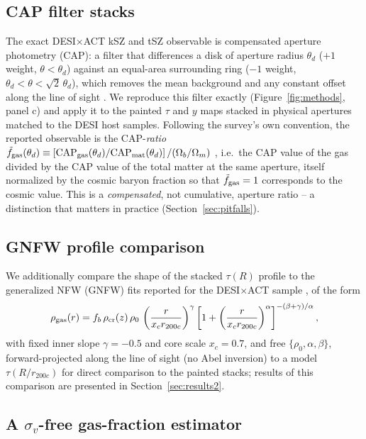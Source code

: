 \documentclass[11pt]{article}
\newcommand{\fgt}{\tilde{f}_{\rm gas}}          %
\begin{document}
\subsection{CAP filter stacks}\label{sec:cap}

The exact DESI$\times$ACT kSZ and tSZ observable is compensated aperture
photometry (CAP): a filter that differences a disk of aperture radius
$\theta_d$ ($+1$ weight, $\theta<\theta_d$) against an equal-area surrounding
ring ($-1$ weight, $\theta_d<\theta<\sqrt{2}\,\theta_d$), which removes the
mean background and any constant offset along the line of sight
\citep{kszpartII}. We reproduce this filter exactly (Figure~\ref{fig:methods},
panel c) and apply it to the painted $\tau$ and $y$ maps stacked in physical
apertures matched to the DESI host samples. Following the survey's own
convention, the reported observable is the CAP-\emph{ratio}
$\fgt(\theta_d) \equiv \left[\mathrm{CAP}_{\rm gas}(\theta_d)/\mathrm{CAP}_{\rm mat}(\theta_d)\right]/(\Omega_b/\Omega_m)$
\citep{kszpartII}, i.e.\ the CAP value of the gas divided by the CAP value of
the total matter at the same aperture, itself normalized by the cosmic baryon
fraction so that $\fgt=1$ corresponds to the cosmic value. This is a
\emph{compensated}, not cumulative, aperture ratio -- a distinction that matters
in practice (Section~\ref{sec:pitfalls}).

\subsection{GNFW profile comparison}\label{sec:gnfw}

We additionally compare the shape of the stacked $\tau(R)$ profile to the
generalized NFW (GNFW) fits reported for the DESI$\times$ACT sample
\citep{kszpartII}, of the form
\begin{equation}
\rho_{\rm gas}(r) = f_b\,\rho_{\rm cr}(z)\,\rho_0\,
\left(\frac{r}{x_c r_{200c}}\right)^{\gamma}
\left[1+\left(\frac{r}{x_c r_{200c}}\right)^{\alpha}\right]^{-(\beta+\gamma)/\alpha},
\end{equation}
with fixed inner slope $\gamma=-0.5$ and core scale $x_c=0.7$, and free
$\{\rho_0,\alpha,\beta\}$, forward-projected along the line of sight (no Abel
inversion) to a model $\tau(R/r_{200c})$ for direct comparison to the painted
stacks; results of this comparison are presented in Section~\ref{sec:results2}. %

\subsection{A $\sigma_v$-free gas-fraction estimator}\label{sec:sigmavfree}
\end{document}
